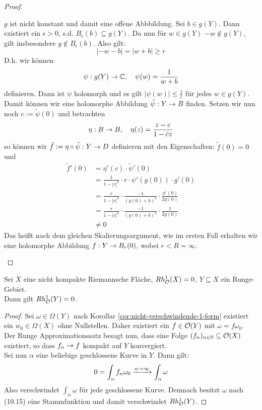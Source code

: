 \begin{proof}
\begin{description}
    $g$ ist nicht konstant und damit eine offene Abbbildung. Sei
    $b \in g(Y)$. Dann existiert ein $\epsilon > 0$,
    s.d. $B_{\epsilon}(b) \subseteq g(Y)$. Da nun für $w \in g(Y)$ $-w
    \notin g(Y)$, gilt insbesondere $g \notin B_\epsilon(b)$. Also
    gilt:
    \[
    |-w - b| = |w + b| \geq r
    \]
    D.h. wir können
    \[
    \psi: g(Y) \rightarrow \mathbb{C}, \quad \psi(w) = \frac{1}{w+b}
    \]
    definieren. Dann ist $\psi$ holomorph und es gilt $|\psi(w)| \leq
    \frac{1}{\epsilon}$ für jedes $w \in g(Y)$. \\
    Damit können wir eine holomorphe Abbildung $\tilde \psi: Y \rightarrow B$
    finden. Setzen wir nun noch $c:= \tilde \psi(0)$ und betrachten
    \[
    \eta: B \rightarrow B, \quad \eta(z) = \frac{z-c}{1-\bar c z}
    \]
    so können wir $\tilde f := \eta \circ \tilde \psi: Y \rightarrow D$
    definieren mit den Eigenschaften: $\tilde f(0) = 0$ und
    \begin{align*}
      \tilde f'(0) & = \eta'(c) \cdot \tilde \psi'(0) \\
      & = \frac{1}{1- |c|^2} \cdot r \cdot \psi'(g(0)) \cdot g'(0) \\
      & = \frac{r}{1 - |c|^2} \cdot \frac{-1}{(g(0) + b)^2} \cdot
      \frac{\phi'(0)}{2 g(0)} \\
      & = \frac{r}{1- |c|^2} \cdot \frac{-1}{(g(0) + b)^2} \cdot
      \frac{1}{2 g(0)} \\
      & \neq 0
    \end{align*}
    Das heißt nach dem gleichen Skalierungsargument, wie im ersten
    Fall erhalten wir eine holomorphe Abbildung $f: Y \rightarrow B_r(0)$, wobei
    $r < R = \infty$.
  \end{description}
\end{proof}

\begin{lemma}
  \label{lemma:runge-keine-kohomo}
  Sei $X$ eine nicht kompakte Riemannsche Fläche, $Rh_{\mathcal{O}}^1(X) = 0$,
  $Y \subseteq X$ ein Runge-Gebiet.\\
  Dann gilt $Rh_{\mathcal{O}}^1(Y) = 0$.
\end{lemma}

\begin{proof}
  Sei $\omega \in \Omega(Y)$ nach Korollar
  \ref{cor:nicht-verschwindende-1-form} existiert ein $w_0 \in
  \Omega(X)$ ohne Nullstellen. Daher
  existiert ein $f \in \mathcal{O}(Y)$ mit $\omega = f \omega_0$. \\
  Der Runge Approximationssatz besagt nun, dass eine Folge $(f_n)_{n
    \in \mathbb{N}} \subseteq \mathcal{O}(X)$ existiert, so dass $f_n \rightarrow f$ kompakt
  auf $Y$ konvergiert. \\
  Sei nun $\alpha$ eine beliebige geschlossene Kurve in $Y$. 
  Dann gilt:
  \[
  0 = \int_\alpha f_n \omega_0 \xrightarrow{n \rightarrow \infty} \int_\alpha
  \omega
  \]
  Also verschwindet $\int_\alpha \omega$ für jede geschlossene
  Kurve. Demnach besitzt $\omega$ nach (10.15) eine Stammfunktion und
  damit verschwindet $Rh_{\mathcal{O}}^1(Y)$.
\end{proof}


